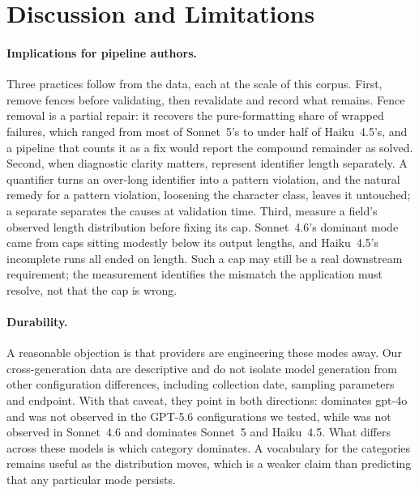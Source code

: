 \section{Discussion and Limitations}
\label{sec:discussion}

\paragraph{Implications for pipeline authors.}
Three practices follow from the data, each at the scale of this corpus.
First, remove fences before validating, then revalidate and record what
remains. Fence removal is a partial repair: it recovers the
pure-formatting share of wrapped failures, which ranged from most of
Sonnet~5's to under half of Haiku~4.5's, and a pipeline that counts it as
a fix would report the compound remainder as solved. Second, when
diagnostic clarity matters, represent identifier length separately. A
 quantifier turns an over-long identifier into a pattern
violation, and the natural remedy for a pattern violation, loosening the
character class, leaves it untouched; a separate 
separates the causes at validation time. Third, measure a field's
observed length distribution before fixing its cap. Sonnet~4.6's
dominant mode came from caps sitting modestly below its output lengths,
and Haiku~4.5's incomplete runs all ended on length. Such a cap may still
be a real downstream requirement; the measurement identifies the
mismatch the application must resolve, not that the cap is wrong.

\paragraph{Durability.}
A reasonable objection is that providers are engineering these modes
away. Our cross-generation data are descriptive and do not isolate model
generation from other configuration differences, including collection
date, sampling parameters and endpoint. With that caveat, they point in
both directions:  dominates gpt-4o and was not
observed in the GPT-5.6 configurations we tested, while
 was not observed in Sonnet~4.6 and dominates
Sonnet~5 and Haiku~4.5. What differs across these models is which
category dominates. A vocabulary for the categories remains useful as the
distribution moves, which is a weaker claim than predicting that any
particular mode persists.


